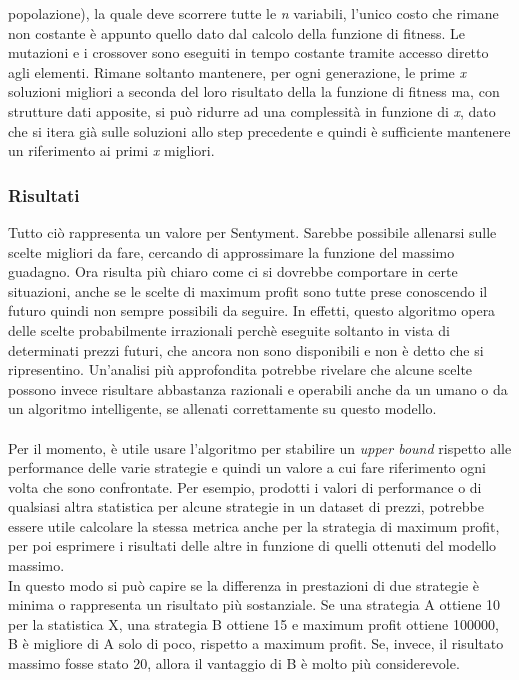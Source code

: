 \documentclass[a4paper,12pt]{report}
\begin{document}
\begin{fig}
popolazione), la quale deve scorrere tutte le \textit{n} variabili, l'unico costo che rimane non costante è appunto quello dato dal calcolo della funzione di fitness. Le mutazioni e i crossover sono eseguiti in tempo costante tramite accesso diretto agli elementi. Rimane soltanto mantenere, per ogni generazione, le prime \textit{x} soluzioni migliori a seconda del loro risultato della la funzione di fitness ma, con strutture dati apposite, si può ridurre ad una complessità in funzione di \textit{x}, dato che si itera già sulle soluzioni allo step precedente e quindi è sufficiente mantenere un riferimento ai primi \textit{x} migliori.

\subsubsection{Risultati}
Tutto ciò rappresenta un valore per Sentyment. Sarebbe possibile allenarsi sulle scelte migliori da fare, cercando di approssimare la funzione del massimo guadagno. Ora risulta più chiaro come ci si dovrebbe comportare in certe situazioni, anche se le scelte di maximum profit sono tutte prese conoscendo il futuro quindi non sempre possibili da seguire. In effetti, questo algoritmo opera delle scelte probabilmente irrazionali perchè eseguite soltanto in vista di determinati prezzi futuri, che ancora non sono disponibili e non è detto che si ripresentino. Un'analisi più approfondita potrebbe rivelare che alcune scelte possono invece risultare abbastanza razionali e operabili anche da un umano o da un algoritmo intelligente, se allenati correttamente su questo modello.\\~\\Per il momento, è utile usare l'algoritmo per stabilire un \textit{upper bound} rispetto alle performance delle varie strategie e quindi un valore a cui fare riferimento ogni volta che sono confrontate. Per esempio, prodotti i valori di performance o di qualsiasi altra statistica per alcune strategie in un dataset di prezzi, potrebbe essere utile calcolare la stessa metrica anche per la strategia di maximum profit, per poi esprimere i risultati delle altre in funzione di quelli ottenuti del modello massimo.\\ In questo modo si può capire se la differenza in prestazioni di due strategie è minima o rappresenta un risultato più sostanziale. Se una strategia A ottiene 10 per la statistica X, una strategia B ottiene 15 e maximum profit ottiene 100000, B è migliore di A solo di poco, rispetto a maximum profit. Se, invece, il risultato massimo fosse stato 20, allora il vantaggio di B è molto più considerevole.

\end{fig}
\end{document}
